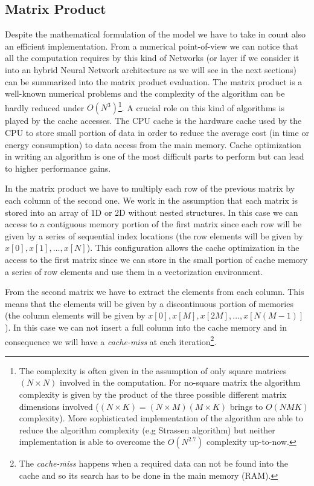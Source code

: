 \documentclass{standalone}
\begin{document}
\subsection[Matrix Product]{Matrix Product}\label{NN:gemm}

Despite the mathematical formulation of the model we have to take in count also an efficient implementation.
From a numerical point-of-view we can notice that all the computation requires by this kind of Networks (or layer if we consider it into an hybrid Neural Network architecture as we will see in the next sections) can be summarized into the matrix product evaluation.
The matrix product is a well-known numerical problems and the complexity of the algorithm can be hardly reduced under $O(N^3)$\footnote{
  The complexity is often given in the assumption of only square matrices $(N\times N)$ involved in the computation.
  For no-square matrix the algorithm complexity is given by the product of the three possible different matrix dimensions involved ($(N\times K) = (N\times M)(M\times K)$ brings to $O(NMK)$ complexity).
  More sophisticated implementation of the algorithm are able to reduce the algorithm complexity (e.g Strassen algorithm) but neither implementation is able to overcome the $O(N^{2.7})$ complexity up-to-now.
}.
A crucial role on this kind of algorithms is played by the cache accesses.
The CPU cache is the hardware cache used by the CPU to store small portion of data in order to reduce the average cost (in time or energy consumption) to data access from the main memory.
Cache optimization in writing an algorithm is one of the most difficult parts to perform but can lead to higher performance gains.

In the matrix product we have to multiply each row of the previous matrix by each column of the second one.
We work in the assumption that each matrix is stored into an array of 1D or 2D without nested structures.
In this case we can access to a contiguous memory portion of the first matrix since each row will be given by a series of sequential index locations (the row elements will be given by $x[0], x[1], \dots, x[N]$).
This configuration allows the cache optimization in the access to the first matrix since we can store in the small portion of cache memory a series of row elements and use them in a vectorization environment.

From the second matrix we have to extract the elements from each column.
This means that the elements will be given by a discontinuous portion of memories (the column elements will be given by $x[0], x[M], x[2M], \dots, x[N(M-1)]$).
In this case we can not insert a full column into the cache memory and in consequence we will have a \emph{cache-miss} at each iteration\footnote{
  The \emph{cache-miss} happens when a required data can not be found into the cache and so its search has to be done in the main memory (RAM).
}.
\end{document}
